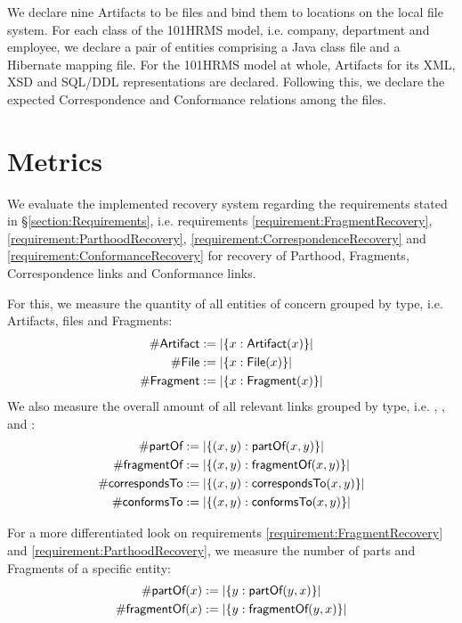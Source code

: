 We declare nine \glspl{Artifact} to be files and bind them to locations on the local file system.
For each class of the \gls{101HRMS} model, i.e. company, department and employee, we declare a pair of entities comprising a \gls{Java} class file and a \gls{Hibernate} mapping file.
For the \gls{101HRMS} model at whole, \glspl{Artifact} for its \gls{XML}, \gls{XSD} and \gls{SQL/DDL} representations are declared.
Following this, we declare the expected \gls{Correspondence} and \gls{Conformance} relations among the files.

\section{Metrics}
\label{section:Metrics}
We evaluate the implemented recovery system regarding the requirements stated in §\ref{section:Requirements}, i.e. requirements \ref{requirement:FragmentRecovery}, \ref{requirement:ParthoodRecovery}, \ref{requirement:CorrespondenceRecovery} and \ref{requirement:ConformanceRecovery} for recovery of \gls{Parthood}, \glspl{Fragment}, \gls{Correspondence} links and \gls{Conformance} links.

For this, we measure the quantity of all entities of concern grouped by type, i.e. \glspl{Artifact}, files and \glspl{Fragment}:
\begin{align*}
\#\textsf{Artifact} &:= |\{ x : \textsf{Artifact}(x) \}| \\
\#\textsf{File} &:= |\{ x : \textsf{File}(x) \}| \\
\#\textsf{Fragment} &:= |\{ x : \textsf{Fragment}(x) \}|
\end{align*}
We also measure the overall amount of all relevant links grouped by type, i.e.
\partOf, \fragmentOf, \correspondsTo~ and \conformsTo:
\begin{align*}
\#\textsf{partOf} &:= |\{ (x,y) : \textsf{partOf}(x,y) \}| \\
\#\textsf{fragmentOf} &:= |\{ (x,y) : \textsf{fragmentOf}(x,y) \}| \\
\#\textsf{correspondsTo} &:= |\{ (x,y) : \textsf{correspondsTo}(x,y) \}| \\
\#\textsf{conformsTo} &:= |\{ (x,y) : \textsf{conformsTo}(x,y) \}| 
\end{align*}

For a more differentiated look on requirements \ref{requirement:FragmentRecovery} and \ref{requirement:ParthoodRecovery}, we measure the number of parts and \glspl{Fragment} of a specific entity:
\begin{align*}
\#\textsf{partOf}(x) &:= |\{ y : \textsf{partOf}(y,x) \}| \\
\#\textsf{fragmentOf}(x) &:= |\{ y : \textsf{fragmentOf}(y,x) \}| 
\end{align*}

